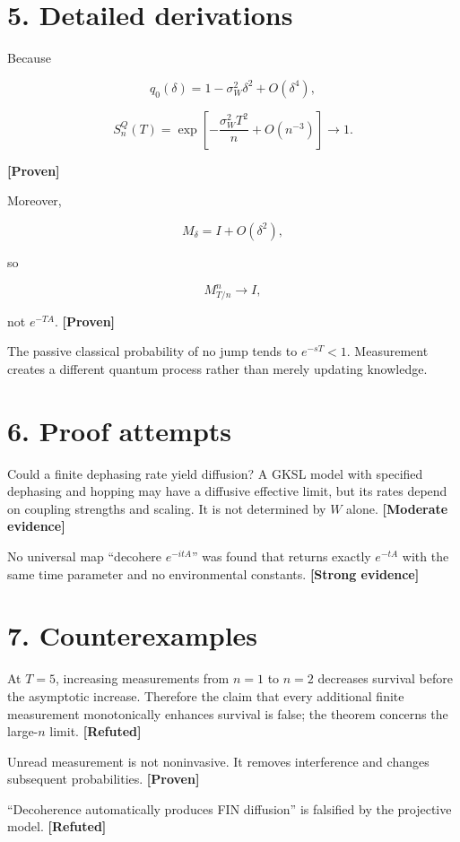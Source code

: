 \documentclass[11pt,a4paper,openany]{report}
\newcommand{\statusProven}{\textcolor{fingreen}{[Proven]}}
\newcommand{\statusStrong}{\textcolor{finblue}{[Strong evidence]}}
\newcommand{\statusModerate}{\textcolor{finviolet}{[Moderate evidence]}}
\newcommand{\statusRefuted}{\textcolor{finred}{[Refuted]}}
\begin{document}
\section{5. Detailed derivations}

Because

\[
q_0(\delta)=1-\sigma_W^2\delta^2+O(\delta^4),
\]

\[
S_n^Q(T)
=\exp\!\left[-\frac{\sigma_W^2T^2}{n}+O(n^{-3})\right]
\longrightarrow1.
\]

\textbf{\statusProven{}}

Moreover,

\[
M_\delta=I+O(\delta^2),
\]

so

\[
M_{T/n}^n\longrightarrow I,
\]

not \(e^{-TA}\). \textbf{\statusProven{}}

The passive classical probability of no jump tends to \(e^{-sT}<1\). Measurement creates a different quantum process rather than merely updating knowledge.

\section{6. Proof attempts}

Could a finite dephasing rate yield diffusion? A GKSL model with specified dephasing and hopping may have a diffusive effective limit, but its rates depend on coupling strengths and scaling. It is not determined by \(W\) alone. \textbf{\statusModerate{}}

No universal map “decohere \(e^{-itA}\)” was found that returns exactly \(e^{-tA}\) with the same time parameter and no environmental constants. \textbf{\statusStrong{}}

\section{7. Counterexamples}

At \(T=5\), increasing measurements from \(n=1\) to \(n=2\) decreases survival before the asymptotic increase. Therefore the claim that every additional finite measurement monotonically enhances survival is false; the theorem concerns the large-\(n\) limit. \textbf{\statusRefuted{}}

Unread measurement is not noninvasive. It removes interference and changes subsequent probabilities. \textbf{\statusProven{}}

“Decoherence automatically produces FIN diffusion” is falsified by the projective model. \textbf{\statusRefuted{}}
\end{document}

